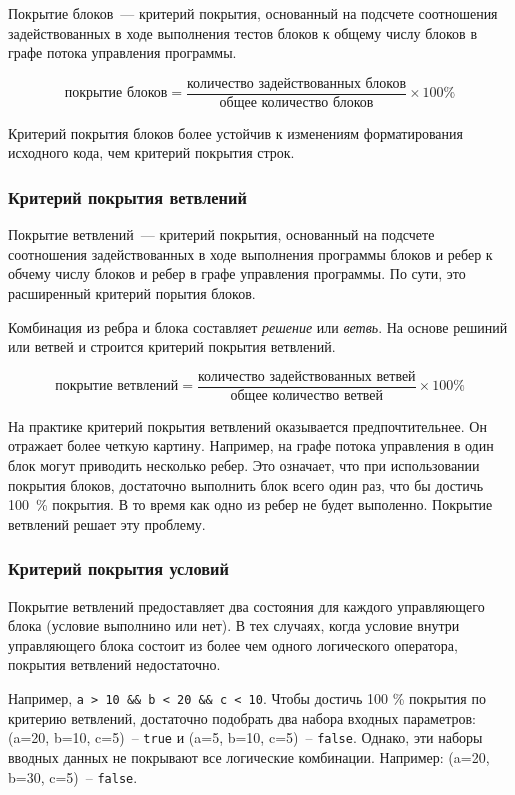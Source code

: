 Покрытие блоков~--- критерий покрытия, основанный на подсчете соотношения задействованных в ходе выполнения тестов блоков к общему числу блоков в графе потока управления программы.

\[ \text{покрытие блоков} = \frac{\text{количество задействованных блоков}}{\text{общее количество блоков}}  \times 100 \% \]

Критерий покрытия блоков более устойчив к изменениям форматирования исходного кода, чем критерий покрытия строк.


\subsubsection{Критерий покрытия ветвлений}

Покрытие ветвлений~--- критерий покрытия, основанный на подсчете соотношения задействованных в ходе выполнения программы блоков и ребер к обчему числу блоков и ребер в графе управления программы. По сути, это расширенный критерий порытия блоков. 


Комбинация из ребра и блока составляет \textit{решение} или \textit{ветвь}. На основе решиний или ветвей и строится критерий покрытия ветвлений.

\[ \text{покрытие ветвлений} = \frac{\text{количество задействованных ветвей}}{\text{общее количество ветвей}}  \times 100 \% \]


На практике критерий покрытия ветвлений оказывается предпочтительнее. Он отражает более четкую картину. Например, на графе потока управления в один блок могут приводить несколько ребер. Это означает, что при использовании покрытия блоков, достаточно выполнить блок всего один раз, что бы достичь 100~\% покрытия. В то время как одно из ребер не будет выполенно. Покрытие ветвлений решает эту проблему.

\subsubsection{Критерий покрытия условий}

Покрытие ветвлений предоставляет два состояния для каждого управляющего блока (условие выполнино или нет). В тех случаях, когда условие внутри управляющего блока состоит из более чем одного логического оператора, покрытия ветвлений недостаточно. 

Например, \texttt{a > 10 \&\& b < 20 \&\& c < 10}. Чтобы достичь 100 \% покрытия по критерию ветвлений, достаточно подобрать два набора входных параметров: (a=20, b=10, c=5)~-- \texttt{true} и (a=5, b=10, c=5)~-- \texttt{false}. Однако, эти наборы вводных данных не покрывают все логические комбинации. Например: (a=20, b=30, c=5)~-- \texttt{false}.

